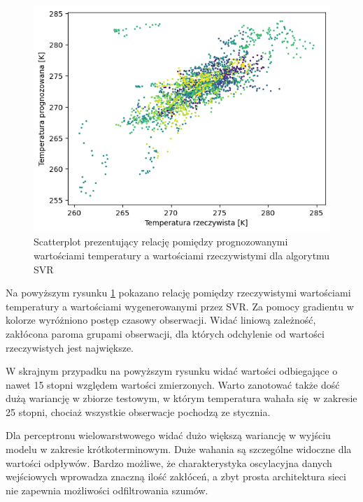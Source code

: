 \begin{figure}[H]
    \centering
    \includegraphics[width=\textwidth]{images/svr_real.png}
    \caption{Scatterplot prezentujący relację pomiędzy prognozowanymi wartościami
    temperatury a wartościami rzeczywistymi dla algorytmu SVR}
    \label{svr-real}
\end{figure}

Na powyższym rysunku \ref{svr-real} pokazano relację pomiędzy rzeczywistymi wartościami
temperatury a wartościami wygenerowanymi przez SVR. Za pomocy gradientu w kolorze wyróżniono postęp
czasowy obserwacji. Widać liniową zależność, zakłócona paroma grupami obserwacji, dla których
odchylenie od wartości rzeczywistych jest największe.

W skrajnym przypadku na powyższym rysunku widać wartości odbiegające o nawet 15 stopni względem
wartości zmierzonych. Warto zanotować także dość dużą wariancję w zbiorze testowym, w którym
temperatura wahała się w zakresie 25 stopni, chociaż wszystkie obserwacje pochodzą ze stycznia.

\pagebreak

Dla perceptronu wielowarstwowego widać dużo większą wariancję w wyjściu modelu 
w zakresie krótkoterminowym. Duże wahania są szczególne widoczne dla wartości odpływów.
Bardzo możliwe, że charakterystyka oscylacyjna danych wejściowych wprowadza znaczną
ilość zakłóceń, a zbyt prosta architektura sieci nie zapewnia możliwości odfiltrowania 
szumów. 

